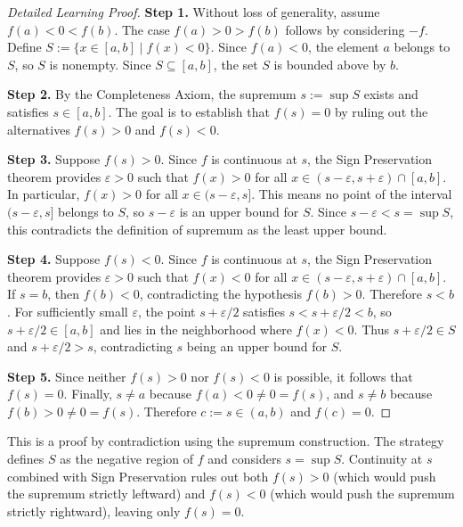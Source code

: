 \begin{proof}[Detailed Learning Proof]
\LRAProofBodyStart

\textbf{Step 1.} Without loss of generality, assume $f(a) < 0 < f(b)$. The case $f(a) > 0 > f(b)$ follows by considering $-f$. Define $S := \{ x \in [a,b] \mid f(x) < 0 \}$. Since $f(a) < 0$, the element $a$ belongs to $S$, so $S$ is nonempty. Since $S \subseteq [a,b]$, the set $S$ is bounded above by $b$.

\textbf{Step 2.} By the Completeness Axiom, the supremum $s := \sup S$ exists and satisfies $s \in [a,b]$. The goal is to establish that $f(s) = 0$ by ruling out the alternatives $f(s) > 0$ and $f(s) < 0$.

\textbf{Step 3.} Suppose $f(s) > 0$. Since $f$ is continuous at $s$, the Sign Preservation theorem provides $\varepsilon > 0$ such that $f(x) > 0$ for all $x \in (s - \varepsilon, s + \varepsilon) \cap [a,b]$. In particular, $f(x) > 0$ for all $x \in (s - \varepsilon, s]$. This means no point of the interval $(s - \varepsilon, s]$ belongs to $S$, so $s - \varepsilon$ is an upper bound for $S$. Since $s - \varepsilon < s = \sup S$, this contradicts the definition of supremum as the least upper bound.

\textbf{Step 4.} Suppose $f(s) < 0$. Since $f$ is continuous at $s$, the Sign Preservation theorem provides $\varepsilon > 0$ such that $f(x) < 0$ for all $x \in (s - \varepsilon, s + \varepsilon) \cap [a,b]$. If $s = b$, then $f(b) < 0$, contradicting the hypothesis $f(b) > 0$. Therefore $s < b$. For sufficiently small $\varepsilon$, the point $s + \varepsilon/2$ satisfies $s < s + \varepsilon/2 < b$, so $s + \varepsilon/2 \in [a,b]$ and lies in the neighborhood where $f(x) < 0$. Thus $s + \varepsilon/2 \in S$ and $s + \varepsilon/2 > s$, contradicting $s$ being an upper bound for $S$.

\textbf{Step 5.} Since neither $f(s) > 0$ nor $f(s) < 0$ is possible, it follows that $f(s) = 0$. Finally, $s \neq a$ because $f(a) < 0 \neq 0 = f(s)$, and $s \neq b$ because $f(b) > 0 \neq 0 = f(s)$. Therefore $c := s \in (a,b)$ and $f(c) = 0$.
\end{proof}

\begin{remark*}
This is a proof by contradiction using the supremum construction. The strategy defines $S$ as the negative region of $f$ and considers $s = \sup S$. Continuity at $s$ combined with Sign Preservation rules out both $f(s) > 0$ (which would push the supremum strictly leftward) and $f(s) < 0$ (which would push the supremum strictly rightward), leaving only $f(s) = 0$.
\end{remark*}

